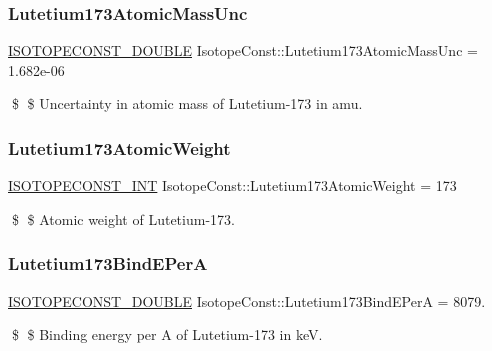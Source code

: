 \subsubsection{\texorpdfstring{Lutetium173\+Atomic\+Mass\+Unc}{Lutetium173AtomicMassUnc}}
{\footnotesize\ttfamily \mbox{\hyperlink{group___isotope_const-_macros_ga8f45a7272ce02c0b4c65c44636ed719a}{I\+S\+O\+T\+O\+P\+E\+C\+O\+N\+S\+T\+\_\+\+D\+O\+U\+B\+LE}} Isotope\+Const\+::\+Lutetium173\+Atomic\+Mass\+Unc = 1.\+682e-\/06}

\$ \$ Uncertainty in atomic mass of Lutetium-\/173 in amu. \mbox{\label{group___isotope_const-_lutetium-_lu173_ga1d19dcc9a54906c7a91f4c18323aba69}} 
\subsubsection{\texorpdfstring{Lutetium173\+Atomic\+Weight}{Lutetium173AtomicWeight}}
{\footnotesize\ttfamily \mbox{\hyperlink{group___isotope_const-_macros_ga5f18360b3e99483a35c32d789e62621c}{I\+S\+O\+T\+O\+P\+E\+C\+O\+N\+S\+T\+\_\+\+I\+NT}} Isotope\+Const\+::\+Lutetium173\+Atomic\+Weight = 173}

\$ \$ Atomic weight of Lutetium-\/173. \mbox{\label{group___isotope_const-_lutetium-_lu173_gae54389839b655417e206d38ac4ddb7a1}} 
\subsubsection{\texorpdfstring{Lutetium173\+Bind\+E\+PerA}{Lutetium173BindEPerA}}
{\footnotesize\ttfamily \mbox{\hyperlink{group___isotope_const-_macros_ga8f45a7272ce02c0b4c65c44636ed719a}{I\+S\+O\+T\+O\+P\+E\+C\+O\+N\+S\+T\+\_\+\+D\+O\+U\+B\+LE}} Isotope\+Const\+::\+Lutetium173\+Bind\+E\+PerA = 8079.}

\$ \$ Binding energy per A of Lutetium-\/173 in keV. \mbox{\label{group___isotope_const-_lutetium-_lu173_ga8257f9ee4a6b3e3a737f28710edcac7f}} 
